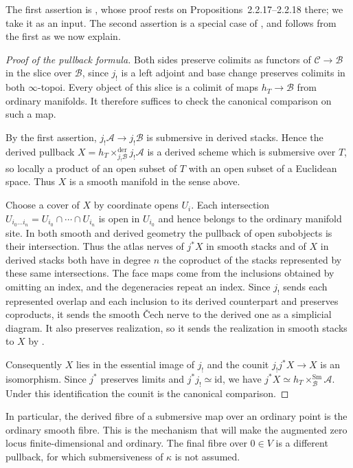 The first assertion is
\cite[Corollary~2.2.19]{Steffens_Representability_Elliptic_Moduli},
whose proof rests on Propositions~2.2.17--2.2.18 there; we take it as an
input. The second assertion is a special case of
\cite[Proposition~2.2.17(3)]{Steffens_Representability_Elliptic_Moduli},
and follows from the first as we now explain.

\begin{proof}[Proof of the pullback formula]
Both sides preserve colimits as functors of $\mathcal C\to\mathcal B$
in the slice over $\mathcal B$, since $j_!$ is a left adjoint and base
change preserves colimits in both $\infty$-topoi. Every object of this
slice is a colimit of maps $h_T\to\mathcal B$ from ordinary manifolds.
It therefore suffices to check the canonical comparison on such a map.

By the first assertion, $j_!\mathcal A\to j_!\mathcal B$ is submersive
in derived stacks. Hence the derived pullback
$X=h_T\times_{j_!\mathcal B}^{\mathrm{der}}j_!\mathcal A$ is a derived
scheme which is submersive over $T$, so locally a product of an open
subset of $T$ with an open subset of a Euclidean space. Thus $X$ is
a smooth manifold in the sense above.

Choose a cover of $X$ by coordinate opens $U_i$. Each intersection
$U_{i_0\ldots i_n}=U_{i_0}\cap\cdots\cap U_{i_n}$ is open in $U_{i_0}$
and hence belongs to the ordinary manifold site. In both smooth and
derived geometry the pullback of open subobjects is their intersection.
Thus the atlas nerves of $j^*X$ in smooth stacks and of $X$ in
derived stacks both have in degree $n$ the coproduct of the stacks
represented by these same intersections. The face maps come
from the inclusions obtained by omitting an index, and the degeneracies
repeat an index. Since $j_!$ sends each represented overlap and each
inclusion to its derived counterpart and preserves coproducts, it sends
the smooth \v{C}ech nerve to the derived one as a simplicial diagram.
It also preserves realization, so it sends the realization in smooth
stacks to $X$ by .

Consequently $X$ lies in the essential image of $j_!$ and the counit
$j_!j^*X\to X$ is an isomorphism. Since $j^*$ preserves limits and
$j^*j_!\simeq\mathrm{id}$, we have
$j^*X\simeq h_T\times_{\mathcal B}^{\mathrm{Sm}}\mathcal A$.
Under this identification the counit is the canonical comparison.
\end{proof}

In particular, the derived fibre of a submersive map over an ordinary
point is the ordinary smooth fibre. This is the mechanism that will
make the augmented zero locus finite-dimensional and ordinary.
The final fibre over $0\in V$ is a different pullback, for which
submersiveness of $\kappa$ is not assumed.

